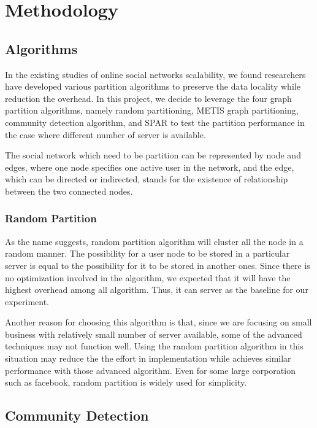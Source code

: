 \section{Methodology}

\subsection{Algorithms}

In the existing studies of online social networks scalability, we found researchers have developed various partition algorithms to preserve the data locality while reduction the overhead. In this project, we decide to leverage the four graph partition algorithms, namely random partitioning, METIS graph partitioning, community detection algorithm, and SPAR to test the partition performance in the case where different number of server is available.

The social network which need to be partition can be represented by node and edges, where one node specifies one active user in the network, and the edge, which can be directed or indirected, stands for the existence of relationship between the two connected nodes.


\subsubsection{Random Partition}

As the name suggests, random partition algorithm will cluster all the node in a random manner. The possibility for a user node to be stored in a particular server is equal to the possibility for it to be stored in another ones. Since there is no optimization involved in the algorithm, we expected that it will have the highest overhead among all algorithm. Thus, it can server as the baseline for our experiment.  

Another reason for choosing this algorithm is that, since we are focusing on small business with relatively small number of server available, some of the advanced techniques may not function well. Using the random partition algorithm in this situation may reduce the the effort in implementation while achieves similar performance with those advanced algorithm. Even for some large corporation such as facebook, random partition is widely used for simplicity. 

\subsection{Community Detection}

